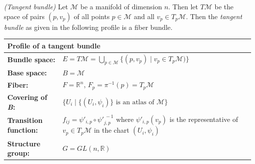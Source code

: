 \begin{beispiel}
	\label{bsp:tangent-bundle}
	\emph{(Tangent bundle)}
	\cite[127-128]{Choquet-Bruhat-et-al-1982}
	Let $\mathscr{M}$ be a manifold of dimension $n$. Then let $T \mathscr{M}$ be the space of pairs $(p, v_p)$ of all points $p \in \mathscr{M}$ and all $v_p \in T_p \mathscr{M}$.
	Then the \emph{tangent bundle}
	as given in the following profile is a fiber bundle.
	
	\medskip
	\noindent
	\begin{tabular}[b]{@{}|lp{50ex}|}
		\hline
		\multicolumn{2}{|l|}{\textbf{Profile of a tangent bundle}} \\ \hline
		\textbf{Bundle space:} & $E = T \mathscr{M} = \bigcup_{p \in \mathscr{M}} \{(p, v_p) \mid v_p \in T_p \mathscr{M})\}$
		\\
		\textbf{Base space:} & $B = \mathscr{M}$
		\\
		\textbf{Fiber:} & $F = \mathbb{R}^n$, $F_p = \pi^{-1}(p) = T_p \mathscr{M}$
		\\
		\textbf{Covering of \emph{B}:} &
		$\{U_i \mid \{(U_i, \psi_i)\} \mbox{ is an atlas of } \mathscr{M}\}$
		\\
		\textbf{Transition function:} &
		$f_{ij} = \psi'_{i,p} \circ {\psi'}_{j,p}^{\ -1}$ where $\psi'_{i,p}(v_p)$ is the representative of $v_p \in T_p \mathscr{M}$ in the chart $(U_i, \psi_i)$
		\\
		\textbf{Structure group:} &
		$G = GL(n, \mathbb{R})$
		\\ \hline
	\end{tabular}
	

\end{beispiel}
